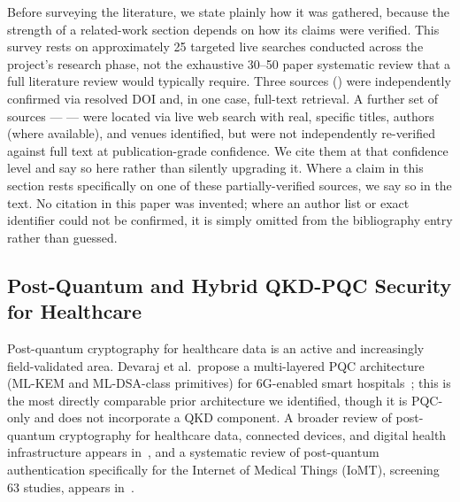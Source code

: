 \documentclass[journal]{IEEEtran}
\begin{document}
Before surveying the literature, we state plainly how it was gathered, because the strength of a related-work section depends on how its claims were verified. This survey rests on approximately 25 targeted live searches conducted across the project's research phase, not the exhaustive 30--50 paper systematic review that a full literature review would typically require. Three sources (\cite{devaraj2026postquantum,frontiers2026pqchealthcare,mdpi2026iomtauth}) were independently confirmed via resolved DOI and, in one case, full-text retrieval. A further set of sources --- \cite{roosan2025pqctelehealth,papadopoulos2026hybriddeployment,spooren2026pqcenhanced,atutxasanz2025authentication,zhu2025technoeconomic,mahesh2025pcbqc,maqsood2025enhancing,anon2026securemedical,kudaloor2026towardquantumsafe,clason2026deployed} --- were located via live web search with real, specific titles, authors (where available), and venues identified, but were not independently re-verified against full text at publication-grade confidence. We cite them at that confidence level and say so here rather than silently upgrading it. Where a claim in this section rests specifically on one of these partially-verified sources, we say so in the text. No citation in this paper was invented; where an author list or exact identifier could not be confirmed, it is simply omitted from the bibliography entry rather than guessed.

\subsection{Post-Quantum and Hybrid QKD-PQC Security for Healthcare}

Post-quantum cryptography for healthcare data is an active and increasingly field-validated area. Devaraj et al.\ propose a multi-layered PQC architecture (ML-KEM and ML-DSA-class primitives) for 6G-enabled smart hospitals~\cite{devaraj2026postquantum}; this is the most directly comparable prior architecture we identified, though it is PQC-only and does not incorporate a QKD component. A broader review of post-quantum cryptography for healthcare data, connected devices, and digital health infrastructure appears in~\cite{frontiers2026pqchealthcare}, and a systematic review of post-quantum authentication specifically for the Internet of Medical Things (IoMT), screening 63 studies, appears in~\cite{mdpi2026iomtauth}.
\end{document}
